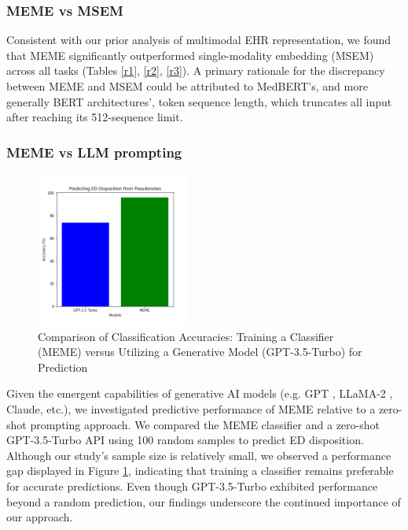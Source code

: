 \documentclass[pmlr]{jmlr}%
\begin{document}
\subsubsection{MEME vs MSEM}
{Consistent with our prior analysis of multimodal EHR representation, we found that MEME significantly outperformed single-modality embedding (MSEM) across all tasks (Tables \ref{r1}, \ref{r2}, \ref{r3}). A primary rationale for the discrepancy between MEME and MSEM could be attributed to MedBERT's, and more generally BERT architectures', token sequence length, which truncates all input after reaching its 512-sequence limit.

\subsubsection{MEME vs LLM prompting}

\begin{figure}[h!]
    \centering
    \includegraphics[width=2in]{dispo.png}
    \vspace*{-0.5cm}
    \caption{Comparison of Classification Accuracies: Training a Classifier (MEME) versus Utilizing a Generative Model (GPT-3.5-Turbo) for Prediction}
    \label{gpt-meme}
    \vspace*{-0.5cm}
\end{figure}

{Given the emergent capabilities of generative AI models (e.g. GPT \citep{radford2018improving}, LLaMA-2 \citep{touvron2023llama}, Claude, etc.), we investigated predictive performance of MEME relative to a zero-shot prompting approach.} {We compared the} MEME classifier and a zero-shot GPT-3.5-Turbo API using 100 random samples to predict ED disposition. Although our study's sample size is relatively small, we observed a performance gap displayed in Figure \ref{gpt-meme}, indicating that training a classifier remains preferable for accurate predictions. Even though GPT-3.5-Turbo exhibited performance beyond a random prediction, our findings underscore the continued importance of our approach.

}
\end{document}
